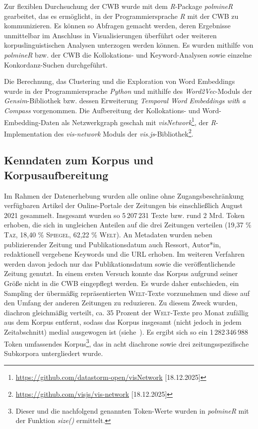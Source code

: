 Zur flexiblen Durchsuchung der CWB wurde mit dem \emph{R}-Package \emph{polmineR} \autocite{blaettePolmineRVerbsNouns2020} gearbeitet, das es ermöglicht, in der Programmiersprache \emph{R} mit der CWB zu kommunizieren. Es können so Abfragen gemacht werden, deren Ergebnisse unmittelbar im Anschluss in Visualisierungen überführt oder weiteren korpuslinguistischen Analysen unterzogen werden können. Es wurden mithilfe von \emph{polmineR} bzw. der CWB die Kollokations- und Keyword-Analysen sowie einzelne Konkordanz-Suchen durchgeführt.

Die Berechnung, das Clustering und die Exploration von Word Embeddings wurde in der Programmiersprache \emph{Python} und mithilfe des \emph{Word2Vec}-Moduls der \emph{Gensim}-Bibliothek \autocite{rehurekSoftwareFrameworkTopic2010} bzw. dessen Erweiterung \emph{Temporal Word Embeddings with a Compass} \autocite[TWEC,][]{dicarloTrainingTemporalWord2019} vorgenommen. Die Aufbereitung der Kollokations- und Word-Embedding-Daten als Netzwerkgraph geschah mit \emph{visNetwork}\footnote{\url{https://github.com/datastorm-open/visNetwork} {[}18.12.2025{]}}, der \emph{R}-Implementation des \emph{vis-network} Moduls der \emph{vis.js}-Bibliothek\footnote{\url{https://github.com/visjs/vis-network} {[}18.12.2025{]}}.

\subsection{Kenndaten zum Korpus und Korpusaufbereitung}\label{kenndaten-zum-korpus-und-korpusaufbereitung}
\largerpage
Im Rahmen der Datenerhebung wurden alle online ohne Zugangsbeschränkung verfügbaren Artikel der Online-Portale der Zeitungen bis einschließlich August 2021 gesammelt. Insgesamt wurden so 5\,207\,231 Texte bzw. rund 2 Mrd. Token erhoben, die sich in ungleichen Anteilen auf die drei Zeitungen verteilen (19,37 \% \textsc{Taz}, 18,40 \% \textsc{Spiegel}, 62,22 \% \textsc{Welt}). An Metadaten wurden neben publizierender Zeitung und Publikationsdatum auch Ressort, Autor*in, redaktionell vergebene Keywords und die URL erhoben. Im weiteren Verfahren werden davon jedoch nur das Publikationsdatum sowie die veröffentlichende Zeitung genutzt. In einem ersten Versuch konnte das Korpus aufgrund seiner Größe nicht in die CWB eingepflegt werden. Es wurde daher entschieden, ein Sampling der übermäßig repräsentierten \textsc{Welt}-Texte vorzunehmen und diese auf den Umfang der anderen Zeitungen zu reduzieren. Zu diesem Zweck wurden, diachron gleichmäßig verteilt, ca. 35 Prozent der \textsc{Welt}-Texte pro Monat zufällig aus dem Korpus entfernt, sodass das Korpus insgesamt (nicht jedoch in jedem Zeitabschnitt) medial ausgewogen ist (siehe~). Es ergibt sich so ein 1\,282\,346\,988 Token umfassendes Korpus\footnote{Dieser und die nachfolgend genannten Token-Werte wurden in \emph{polmineR} mit der Funktion \emph{size()} ermittelt.}, das in acht diachrone sowie drei zeitungsspezifische Subkorpora untergliedert wurde.

